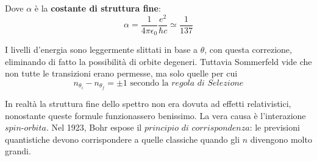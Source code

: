 Dove $\alpha$ è la \textbf{costante di struttura fine}:
$$ \alpha = \frac{1}{4\pi\epsilon_0} \frac{e^2}{\hbar c} \simeq \frac{1}{137}  $$

I livelli d'energia sono leggermente slittati in base a $\theta$, con questa correzione, eliminando di fatto la possibilità di orbite degeneri.
Tuttavia Sommerfeld vide che non tutte le transizioni erano permesse, ma solo quelle per cui
$$n_{\theta_i} - n_{\theta_f} = \pm 1 \mbox{ secondo la $\textit{regola di Selezione}$} $$

In realtà la struttura fine dello spettro non era dovuta ad effetti relativistici, nonostante queste formule funzionassero benissimo.
La vera causa è l'interazione $\textit{spin-orbita}$.
Nel 1923, Bohr espose il $\textit{principio di corrispondenza}$: le previsioni quantistiche devono corrispondere a quelle classiche quando gli $n$ divengono molto grandi.









